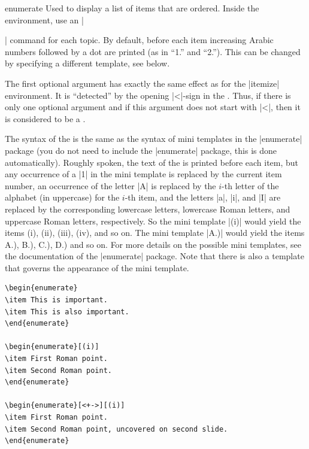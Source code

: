 \begin{environment}{{enumerate}}
  Used to display a list of items that are ordered. Inside the environment, use an |\item| command for each topic. By default, before each item increasing Arabic numbers followed by a dot are printed (as in ``1.'' and ``2.''). This can be changed by specifying a different template, see below.

  The first optional argument  has exactly the same effect as for the |itemize| environment. It is ``detected'' by the opening |<|-sign in the . Thus, if there is only one optional argument and if this argument does not start with |<|, then it is considered to be a .

  The syntax of the  is the same as the syntax of mini templates in the |enumerate| package (you do not need to include the |enumerate| package, this is done automatically). Roughly spoken, the text of the  is printed before each item, but any occurrence of a |1| in the mini template is replaced by the current item number, an occurrence of the letter |A| is replaced by the $i$-th letter of the alphabet (in uppercase) for the $i$-th item, and the letters |a|, |i|, and |I| are replaced by the corresponding lowercase letters, lowercase Roman letters, and uppercase Roman letters, respectively. So the mini template |(i)| would yield the items (i), (ii), (iii), (iv), and so on. The mini template |A.)| would yield the items A.), B.), C.), D.) and so on. For more details on the possible mini templates, see the documentation of the |enumerate| package. Note that there is also a template that governs the appearance of the mini template.

  \example
\begin{verbatim}
\begin{enumerate}
\item This is important.
\item This is also important.
\end{enumerate}

\begin{enumerate}[(i)]
\item First Roman point.
\item Second Roman point.
\end{enumerate}

\begin{enumerate}[<+->][(i)]
\item First Roman point.
\item Second Roman point, uncovered on second slide.
\end{enumerate}
\end{verbatim}


\end{environment}

